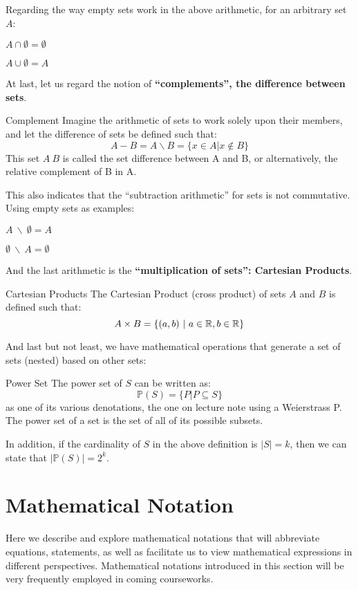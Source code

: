 Regarding the way empty sets work in the above arithmetic, for an arbitrary set $A$:
\begin{bindenum}
    \item $A \cap \emptyset = \emptyset$
    \item $A \cup \emptyset = A$
\end{bindenum}
At last, let us regard the notion of \textbf{``complements'', the difference between sets}.
\begin{ln-define}{Complement}{}
    Imagine the arithmetic of sets to work solely upon their members, and let the difference of sets be defined such that:
    \[A - B = A \backslash B = \{x \in A | x \notin B\}\]
    This set $A \ B$ is called the set difference between A and B, or alternatively, the relative complement of B in A.
\end{ln-define}
This also indicates that the ``subtraction arithmetic'' for sets is not commutative. Using empty sets as examples:
\begin{bindenum}
    \item $A\ \backslash\ \emptyset = A$
    \item $\emptyset\ \backslash\ A = \emptyset$
\end{bindenum}
And the last arithmetic is the \textbf{``multiplication of sets'': Cartesian Products}.
\begin{ln-define}{Cartesian Products}{}
    The Cartesian Product (cross product) of sets $A$ and $B$ is defined such that:
    \[A \times B = \{(a, b)\ |\ a \in \mathbb{R}, b \in \mathbb{R}\}\]
\end{ln-define}
And last but not least, we have mathematical operations that generate a set of sets (nested) based on other sets:
\begin{ln-define}{Power Set}{}
    The power set of $S$ can be written as:
    \[\mathbb{P} (S) = \{P | P \subseteq S\}\]
    as one of its various denotations, the one on lecture note using a Weierstrass P. \\
    The power set of a set is the set of all of its possible subsets.
\end{ln-define}
In addition, if the cardinality of $S$ in the above definition is $|S| = k$, then we can state that $|\mathbb{P} (S)| = 2^k$.

\section{Mathematical Notation}
Here we describe and explore mathematical notations that will abbreviate equations, statements, as well as facilitate us to view mathematical expressions in different perspectives. Mathematical notations introduced in this section will be very frequently employed in coming courseworks.

